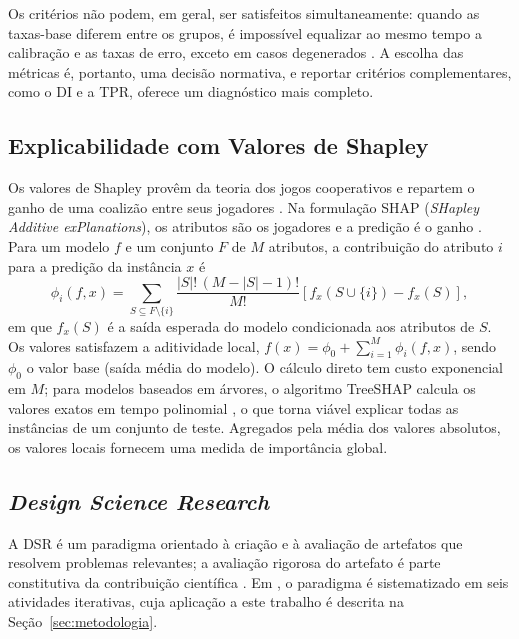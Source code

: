 Os critérios não podem, em geral, ser satisfeitos simultaneamente: quando as taxas-base diferem entre os grupos, é impossível equalizar ao mesmo tempo a calibração e as taxas de erro, exceto em casos degenerados \cite{kleinberg2017inherent, chouldechova2017fair}. A escolha das métricas é, portanto, uma decisão normativa, e reportar critérios complementares, como o DI e a TPR, oferece um diagnóstico mais completo.

\subsection{Explicabilidade com Valores de Shapley}
\label{sec:fund_xai}

Os valores de Shapley provêm da teoria dos jogos cooperativos e repartem o ganho de uma coalizão entre seus jogadores \cite{shapley1953value}. Na formulação SHAP (\textit{SHapley Additive exPlanations}), os atributos são os jogadores e a predição é o ganho \cite{lundberg2017unified}. Para um modelo $f$ e um conjunto $F$ de $M$ atributos, a contribuição do atributo $i$ para a predição da instância $x$ é
\begin{equation}
\phi_i(f, x) = \sum_{S \subseteq F \setminus \{i\}} \frac{|S|!\,(M - |S| - 1)!}{M!} \left[ f_x(S \cup \{i\}) - f_x(S) \right],
\label{eq:shapley}
\end{equation}
em que $f_x(S)$ é a saída esperada do modelo condicionada aos atributos de $S$. Os valores satisfazem a aditividade local, $f(x) = \phi_0 + \sum_{i=1}^{M} \phi_i(f, x)$, sendo $\phi_0$ o valor base (saída média do modelo). O cálculo direto tem custo exponencial em $M$; para modelos baseados em árvores, o algoritmo TreeSHAP calcula os valores exatos em tempo polinomial \cite{lundberg2020local}, o que torna viável explicar todas as instâncias de um conjunto de teste. Agregados pela média dos valores absolutos, os valores locais fornecem uma medida de importância global.

\subsection{\textit{Design Science Research}}
\label{sec:fund_dsr}

A DSR é um paradigma orientado à criação e à avaliação de artefatos que resolvem problemas relevantes; a avaliação rigorosa do artefato é parte constitutiva da contribuição científica \cite{hevner2004design}. Em \cite{peffers2007design}, o paradigma é sistematizado em seis atividades iterativas, cuja aplicação a este trabalho é descrita na Seção~\ref{sec:metodologia}.

